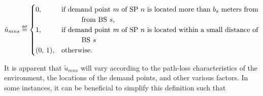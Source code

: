 \documentclass[12pt,dvipsnames]{report}
\newif\ifisdoublespacing
\newcommand\defeq{\mathrel{\overset{\makebox[0pt]{\mbox{\normalfont\tiny\sffamily def}}}{=}}}
\newcommand\tab[1][1cm]{\hspace*{#1}}
\begin{document}
\ifisdoublespacing
	\begin{singlespacing}
		\begin{equation} \label{eq:umns}
			\tilde{u}_{mns} \defeq
			\begin{cases}
				0,& \text{if demand point $m$ of SP $n$ is located more than $b_s$ meters from}\\
				& \text{\tab from BS $s$;}\\
				\\
				1,& \text{if demand point $m$ of SP $n$ is located within a small distance of}\\
				& \text{\tab BS $s$;}\\
				\\
				(0,\, 1),& \text{otherwise.}
			\end{cases}
		\end{equation}
	\end{singlespacing}
\else
	\begin{equation} \label{eq:umns}
		\tilde{u}_{mns} \defeq
		\begin{cases}
			0,& \text{if demand point $m$ of SP $n$ is located more than $b_s$ meters from}\\
			& \text{\tab from BS $s$,}\\
			1,& \text{if demand point $m$ of SP $n$ is located within a small distance of}\\
			& \text{\tab BS $s$}\\
			(0,\, 1),& \text{otherwise.}
		\end{cases}
	\end{equation}
\fi

It is apparent that $\tilde{u}_{mns}$ will vary according to the path-loss characteristics of the environment, the locations of the demand points, and other various factors.  In some instances, it can be beneficial to simplify this definition such that
\end{document}
